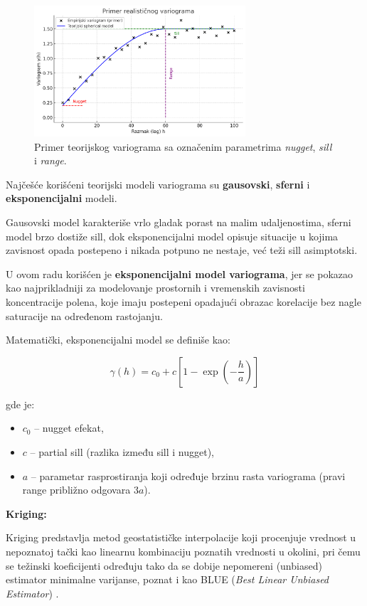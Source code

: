 \documentclass[12pt]{article}
\begin{document}
\begin{figure}[H]
    \centering
    \includegraphics[width=0.7\textwidth]{stkriging/primer.png}
    \caption{Primer teorijskog variograma sa označenim parametrima \textit{nugget}, \textit{sill} i \textit{range}.}
    \label{fig:primer_variogram}
\end{figure}

Najčešće korišćeni teorijski modeli variograma su \textbf{gausovski}, \textbf{sferni} i \textbf{eksponencijalni} modeli.

Gausovski model karakteriše vrlo gladak porast na malim udaljenostima, sferni model brzo dostiže sill, dok eksponencijalni model opisuje situacije u kojima zavisnost opada postepeno i nikada potpuno ne nestaje, već teži sill asimptotski.

U ovom radu korišćen je \textbf{eksponencijalni model variograma}, jer se pokazao kao najprikladniji za modelovanje prostornih i vremenskih zavisnosti koncentracije polena, koje imaju postepeni opadajući obrazac korelacije bez nagle saturacije na određenom rastojanju.

Matematički, eksponencijalni model se definiše kao:

\begin{equation}
\gamma(h) = c_0 + c \left[ 1 - \exp \left( -\frac{h}{a} \right) \right]
\end{equation}

gde je:
\begin{itemize}
\item $c_0$ -- nugget efekat,
\item $c$ -- partial sill (razlika između sill i nugget),
\item $a$ -- parametar rasprostiranja koji određuje brzinu rasta variograma (pravi range približno odgovara $3a$).
\end{itemize}

\textbf{Kriging:}

Kriging predstavlja metod geostatističke interpolacije koji procenjuje vrednost u nepoznatoj tački kao linearnu kombinaciju poznatih vrednosti u okolini, pri čemu se težinski koeficijenti određuju tako da se dobije nepomereni (unbiased) estimator minimalne varijanse, poznat i kao BLUE (\textit{Best Linear Unbiased Estimator}) \cite{cressie1993statistics, isaaks1989applied}.
\end{document}
